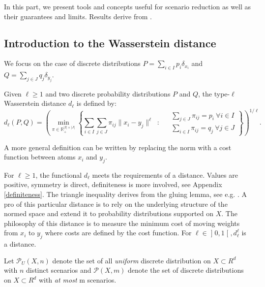 \documentclass{amsart}
\begin{document}
In this part, we present tools and concepts useful for scenario reduction as well as their guarantees and limits. Results derive from \cite{rujeerapaiboon_scenario_2022}. 

\subsection{Introduction to the Wasserstein distance}
We focus on the case of discrete distributions $P=\sum_{i\in I}p_i\delta_{x_i}$ and $Q=\sum_{j\in J}q_j\delta_{y_j}$.
\begin{definition}
Given $\ell\geq1$ and two discrete probability distributions $P$ and $Q$, the type-$\ell$ Wasserstein distance $d_\ell$ is defined by:
$$
d_\ell(P,Q)=\left(\min_{\pi\in\mathbb{R}_+^{\lvert I\rvert\times\lvert J\rvert}}\left\{ 
\sum_{i\in I}\sum_{j\in J}\pi_{ij}\lVert x_i-y_j\rVert^\ell \: \text{ : } \:  \begin{aligned}
& \sum_{j\in J}\pi_{ij}=p_i \: \forall i\in I \\
& \sum_{i\in I}\pi_{ij}=q_j \: \forall j\in J
\end{aligned}\right\}\right)^{1/\ell}.
$$
\end{definition}

\begin{remark}\label{remark1}
    A more general definition can be written by replacing the norm with a cost function between atoms $x_i$ and $y_j$.
\end{remark}
For $\ell\geq1$, the functional $d_\ell$ meets the requirements of a distance. Values are positive, symmetry is direct, definiteness is more involved, see Appendix \ref{definiteness}. The triangle inequality derives from the gluing lemma, see e.g. \cite[Chapter 1]{peyre_computational_2019}. A pro of this particular distance is to rely on the underlying structure of the normed space and extend it to probability distributions supported on $X$. The philosophy of this distance is to measure the minimum cost of moving weights from $x_i$ to $y_j$ where costs are defined by the cost function. For $\ell\in\mathopen{]}0,1\mathclose{[}, d_\ell^\ell$ is a distance.
\newline

Let $\mathcal{P}_U(X,n)$ denote the set of all \emph{uniform} discrete distribution on $X\subset R^d$ with $n$ distinct scenarios and $\mathcal{P}(X,m)$ denote the set of discrete distributions on $X\subset R^d$ with \emph{at most} m scenarios. 
\newline
\end{document}
